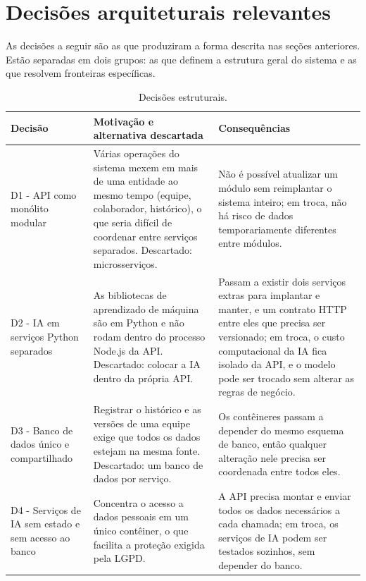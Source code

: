 \documentclass[a4paper,12pt,oneside,openany]{book}
\newif\iforientacoes
\newcommand{\orientacao}[1]{%
    \iforientacoes
        \begin{quote}
        \small\itshape\textbf{Orientação:} #1
        \end{quote}
    \fi
}
\begin{document}
\FloatBarrier

\section{Decisões arquiteturais relevantes}\label{sec:decisoes}

\orientacao{Registrem as decisões que tiveram impacto significativo na
arquitetura. Para cada decisão, apresentem de forma breve a motivação,
alternativas consideradas quando pertinente e principais consequências.}

As decisões a seguir são as que produziram a forma descrita nas seções
anteriores. Estão separadas em dois grupos: as que definem a estrutura geral do
sistema e as que resolvem fronteiras específicas.

\begin{table}[H]
\centering
\small
\caption{Decisões estruturais.}
\label{tab:adr-estruturais}
\begin{tabularx}{0.97\textwidth}{p{} X X}
\toprule
\textbf{Decisão} & \textbf{Motivação e alternativa descartada} &
\textbf{Consequências} \\
\midrule
D1 - API como monólito modular & Várias operações do sistema mexem em mais
de uma entidade ao mesmo tempo (equipe, colaborador, histórico), o que seria
difícil de coordenar entre serviços separados. Descartado: microsserviços. &
Não é possível atualizar um módulo sem reimplantar o sistema inteiro; em
troca, não há risco de dados temporariamente diferentes entre módulos. \\
D2 - IA em serviços Python separados & As bibliotecas de aprendizado de
máquina são em Python e não rodam dentro do processo Node.js da API.
Descartado: colocar a IA dentro da própria API. & Passam a existir dois
serviços extras para implantar e manter, e um contrato HTTP entre eles que
precisa ser versionado; em troca, o custo computacional da IA fica isolado da
API, e o modelo pode ser trocado sem alterar as regras de negócio. \\
D3 - Banco de dados único e compartilhado & Registrar o histórico e as
versões de uma equipe exige que todos os dados estejam na mesma fonte.
Descartado: um banco de dados por serviço. & Os contêineres passam a
depender do mesmo esquema de banco, então qualquer alteração nele precisa
ser coordenada entre todos eles. \\
D4 - Serviços de IA sem estado e sem acesso ao banco & Concentra o acesso a
dados pessoais em um único contêiner, o que facilita a proteção exigida pela
LGPD. & A API precisa montar e enviar todos os dados necessários a cada
chamada; em troca, os serviços de IA podem ser testados sozinhos, sem
depender do banco. \\
\bottomrule
\end{tabularx}
\end{table}
\end{document}
